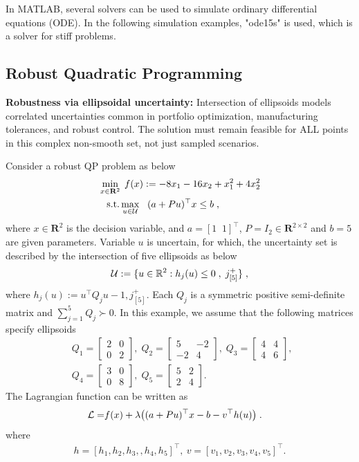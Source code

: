 \documentclass[journal,twoside,web]{ieeecolor}
\newcommand{\rev}[1]{\textcolor{revisionblue}{#1}}
\begin{document}
In MATLAB, several solvers can be used to simulate ordinary differential equations (ODE). In the following simulation examples, "ode15s" is used, which is a solver for stiff problems.

\subsection{Robust Quadratic Programming}

\rev{\textbf{Robustness via ellipsoidal uncertainty:} Intersection of ellipsoids models correlated uncertainties common in portfolio optimization, manufacturing tolerances, and robust control. The solution must remain feasible for ALL points in this complex non-smooth set, not just sampled scenarios.}

Consider a robust QP problem as below
\begin{align} \label{ro_simulation}
&\min_{x \in \mathbf{R}^2} \;f(x):=-8x_1-16x_2+x_1^2+4x_2^2\nonumber\\
&\;\;\;\text{s.t.} \max_{u\in {\cal U}} \;\;\; (a+Pu)^\top x\leq b\;,
\end{align}
where $x \in \mathbf{R}^2$ is the decision variable, and $a =[1\;\;1]^\top$, $P=I_2 \in \mathbf{R}^{2 \times 2}$ and $b=5$ are given parameters. Variable $u$ is uncertain, for which, the uncertainty set is described by the intersection of five ellipsoids as below
\begin{align*}{\cal U}:=\{u \in \mathbb{R}^{2}:h_{j}(u) \leq 0\;,\; j^+_{[5]}\}\;,\end{align*}
where
$h_j(u):=u^\top Q_j u-1, j^+_{[5]}$. Each $Q_{j}$ is a symmetric positive semi-definite matrix and $ \sum_{j=1}^{5} Q_j \succ 0$. In this example, we assume that the following matrices specify ellipsoids
\begin{align*}
&Q_1=\left[\begin{array}{ccl} 2 & 0\\0 & 2 \end{array}\right],\; Q_2=\left[\begin{array}{ccl} 5 & -2\\-2 & 4  \end{array}\right],\; Q_3=\left[\begin{array}{ccl} 4 & 4\\4 & 6\end{array}\right],\;\\
&Q_4=\left[\begin{array}{ccl} 3 & 0\\0 & 8 \end{array}\right],\;
Q_5=\left[\begin{array}{ccl} 5 & 2\\2 & 4 \end{array}\right].
\end{align*}
The Lagrangian function can be written as
\begin{align*}
{\cal L}=&f(x)+\lambda \big((a+Pu)^\top x-b-v ^\top h(u)\big)\;.
\end{align*}
where
\begin{align*}
h=[h_1,h_2,h_3,,h_4,h_5]^\top ,\ v=[v_1,v_2,v_3,v_4,v_5]^\top.
\end{align*}
\end{document}
